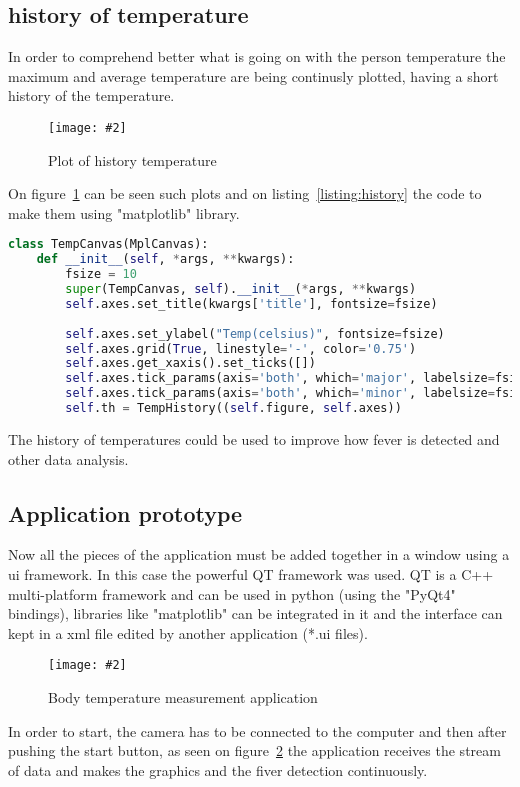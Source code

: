 \documentclass[hidelinks,11pt,a4paper,oneside,article]{memoir}
\newcommand{\putimage}[3][10] %
{
\begin{figure}[h]
    \centering
    \captionsetup{justification=centering}
    \texttt{[image: \#2]}
    \caption{#3}
    \label{fig:#2}
\end{figure}
}
\begin{document}
\subsection*{history of temperature}
In order to comprehend better what is going on with the person temperature the maximum and average temperature are being continusly plotted, having a short history of the temperature.
    \putimage{history}{Plot of history temperature}
On figure~\ref{fig:history} can be seen such plots and on listing~\ref{listing:history} the code to make them using "matplotlib" library.

\begin{lstlisting}[label={listing:history},caption={Class to plot the graphic of temperatures},language=Python, style=styleprogramming]
class TempCanvas(MplCanvas):
    def __init__(self, *args, **kwargs):
        fsize = 10
        super(TempCanvas, self).__init__(*args, **kwargs)
        self.axes.set_title(kwargs['title'], fontsize=fsize)
        
        self.axes.set_ylabel("Temp(celsius)", fontsize=fsize)
        self.axes.grid(True, linestyle='-', color='0.75')
        self.axes.get_xaxis().set_ticks([])
        self.axes.tick_params(axis='both', which='major', labelsize=fsize - 2)
        self.axes.tick_params(axis='both', which='minor', labelsize=fsize - 2)
        self.th = TempHistory((self.figure, self.axes))
\end{lstlisting}

The history of temperatures could be used to improve how fever is detected and other data analysis.

\subsection*{Application prototype}
Now all the pieces of the application must be added together in a window using a \gls{ui} framework. In this case the powerful QT framework was used. QT is a C++ multi-platform framework and can be used in python (using the "PyQt4" bindings), libraries like "matplotlib" can be integrated in it and the interface can kept in a xml file edited by another application (*.ui files).

\putimage[16]{fiber-detector-prototype}{Body temperature measurement application}

In order to start, the camera has to be connected to the computer and then after pushing the start button, as seen on figure~\ref{fig:fiber-detector-prototype} the application receives the stream of data and makes the graphics and the fiver detection continuously.
\end{document}
